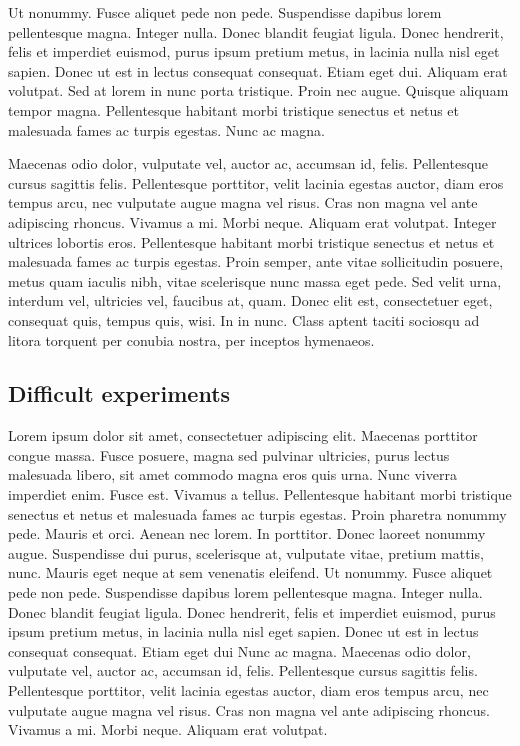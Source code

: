\documentclass{biorxiv}
\begin{document}
\begin{methods}
Ut nonummy. Fusce aliquet pede non pede. Suspendisse dapibus lorem
pellentesque magna. Integer nulla. Donec blandit feugiat ligula. Donec
hendrerit, felis et imperdiet euismod, purus ipsum pretium metus, in lacinia
nulla nisl eget sapien. Donec ut est in lectus consequat consequat. Etiam eget
dui. Aliquam erat volutpat. Sed at lorem in nunc porta tristique. Proin nec
augue. Quisque aliquam tempor magna. Pellentesque habitant morbi tristique
senectus et netus et malesuada fames ac turpis egestas. Nunc ac magna.

Maecenas odio dolor, vulputate vel, auctor ac, accumsan id, felis.
Pellentesque cursus sagittis felis. Pellentesque porttitor, velit lacinia
egestas auctor, diam eros tempus arcu, nec vulputate augue magna vel risus.
Cras non magna vel ante adipiscing rhoncus. Vivamus a mi. Morbi neque. Aliquam
erat volutpat. Integer ultrices lobortis eros. Pellentesque habitant morbi
tristique senectus et netus et malesuada fames ac turpis egestas. Proin
semper, ante vitae sollicitudin posuere, metus quam iaculis nibh, vitae
scelerisque nunc massa eget pede. Sed velit urna, interdum vel, ultricies vel,
faucibus at, quam. Donec elit est, consectetuer eget, consequat quis, tempus
quis, wisi. In in nunc. Class aptent taciti sociosqu ad litora torquent per
conubia nostra, per inceptos hymenaeos.

\subsection{Difficult experiments}
Lorem ipsum dolor sit amet, consectetuer adipiscing elit. Maecenas porttitor
congue massa. Fusce posuere, magna sed pulvinar ultricies, purus lectus
malesuada libero, sit amet commodo magna eros quis urna. Nunc viverra
imperdiet enim. Fusce est. Vivamus a tellus. Pellentesque habitant morbi
tristique senectus et netus et malesuada fames ac turpis egestas. Proin
pharetra nonummy pede. Mauris et orci. Aenean nec lorem. In porttitor. Donec
laoreet nonummy augue. Suspendisse dui purus, scelerisque at, vulputate vitae,
pretium mattis, nunc. Mauris eget neque at sem venenatis eleifend. Ut nonummy.
Fusce aliquet pede non pede. Suspendisse dapibus lorem pellentesque magna.
Integer nulla. Donec blandit feugiat ligula. Donec hendrerit, felis et
imperdiet euismod, purus ipsum pretium metus, in lacinia nulla nisl eget
sapien. Donec ut est in lectus consequat consequat. Etiam eget dui Nunc ac
magna. Maecenas odio dolor, vulputate vel, auctor ac, accumsan id, felis.
Pellentesque cursus sagittis felis. Pellentesque porttitor, velit lacinia
egestas auctor, diam eros tempus arcu, nec vulputate augue magna vel risus.
Cras non magna vel ante adipiscing rhoncus. Vivamus a mi. Morbi neque. Aliquam
erat volutpat.


\end{methods}
\end{document}
